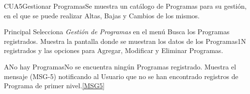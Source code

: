 	\begin{UseCase}{CUA5}{Gestionar Programas}{Se muestra un catálogo de Programas para su gestión, en el que se puede realizar Altas, Bajas y Cambios de los mismos.}
	\end{UseCase}
	
	
	
	\begin{UCtrayectoria}{Principal}
		\UCpaso[\UCactor] Selecciona \textit{Gestión de Programas} en el men\'u 
		\UCpaso Busca los Programas registrados.\label{paso:CUS1buscarProgramas1N}
		\UCpaso Muestra la pantalla  donde se muestran los datos de los Programas1N registrados y las opciones para Agregar, Modificar y Eliminar Programas.  
	\end{UCtrayectoria}

         \begin{UCtrayectoriaA}{A}{No hay Programas}{No se encuentra ningún Programas registrado.}
		\UCpaso Muestra el mensaje (MSG-5) notificando al Usuario que no se han encontrado registros de Programa de primer nivel.\ref{MSG5}
	\end{UCtrayectoriaA}
	  
